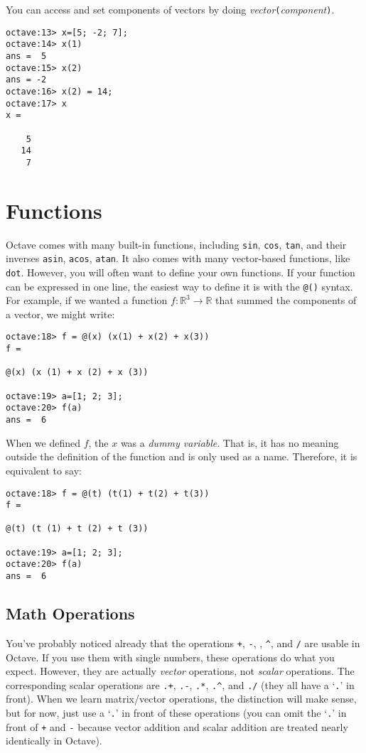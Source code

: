 \documentclass[letter]{article}
\newcommand{\R}{\mathbb{R}}
\begin{document}
	You can access and set components of vectors by doing \emph{vector}{\tt (}\emph{component}{\tt )}.
	\begin{lstlisting}[style=Matlab-Pyglike,escapechar=`]
octave:13> x=[5; -2; 7];
octave:14> x(1)
ans =  5
octave:15> x(2)
ans = -2
octave:16> x(2) = 14;
octave:17> x
x =

    5
   14
    7
	\end{lstlisting}

	\section{Functions}
	{\sc Octave} comes with many built-in functions, including {\tt sin}, {\tt cos}, {\tt tan},
	and their inverses {\tt asin}, {\tt acos}, {\tt atan}.  It also comes with many vector-based
	functions, like {\tt dot}.  However, you will often want to define your own functions.  If your
	function can be expressed in one line, the easiest way to define it is with the {\tt @()} syntax.
	For example, if we wanted a function $f:\R^3\to \R$ that summed the components of a vector,
	we might write:
\begin{lstlisting}[style=Matlab-Pyglike,escapechar=`]
octave:18> f = @(x) (x(1) + x(2) + x(3))
f =

@(x) (x (1) + x (2) + x (3))

octave:19> a=[1; 2; 3];
octave:20> f(a)
ans =  6
\end{lstlisting}
	When we defined $f$, the $x$ was a \emph{dummy variable}.  That is, it has no meaning outside the definition
	of the function and is only used as a name.  Therefore, it is equivalent to say:
	\begin{lstlisting}[style=Matlab-Pyglike,escapechar=`]
octave:18> f = @(t) (t(1) + t(2) + t(3))
f =

@(t) (t (1) + t (2) + t (3))

octave:19> a=[1; 2; 3];
octave:20> f(a)
ans =  6
	\end{lstlisting}

	\subsection{Math Operations}
	You've probably noticed already that the operations {\tt +}, {\tt -}, {\tt *}, {\tt \textasciicircum}, and {\tt /} are
	usable in {\sc Octave}.  If you use them with single numbers, these operations do
	what you expect.  However, they are actually \emph{vector} operations, not \emph{scalar} operations.
	The corresponding scalar operations are {\tt .+}, {\tt .-}, {\tt .*}, {\tt .\textasciicircum}, and {\tt ./} (they all
	have a `{\tt .}' in front).  When we learn matrix/vector operations, the distinction will
	make sense, but for now, just use a `{\tt .}' in front of these operations (you can omit the `{\tt .}'
	in front of {\tt +} and {\tt -} because vector addition and scalar addition are treated nearly identically
	in {\sc Octave}).
\end{document}
